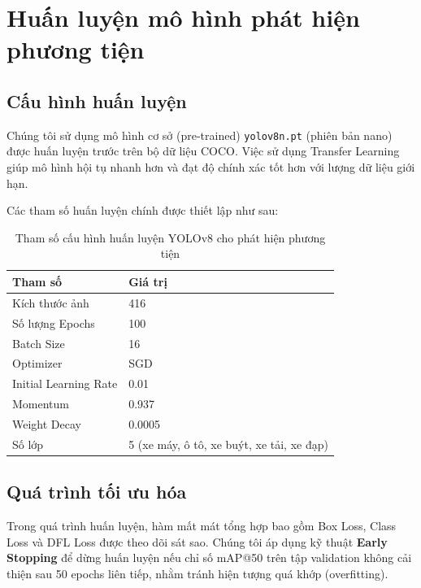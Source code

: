 \section{Huấn luyện mô hình phát hiện phương tiện}

\subsection{Cấu hình huấn luyện}
Chúng tôi sử dụng mô hình cơ sở (pre-trained) \texttt{yolov8n.pt} (phiên bản nano) được huấn luyện trước trên bộ dữ liệu COCO. Việc sử dụng Transfer Learning giúp mô hình hội tụ nhanh hơn và đạt độ chính xác tốt hơn với lượng dữ liệu giới hạn.

Các tham số huấn luyện chính được thiết lập như sau:

\begin{table}[!ht]
\centering
\caption{Tham số cấu hình huấn luyện YOLOv8 cho phát hiện phương tiện}
\label{tab:training_params_vehicle}
\begin{tabular}{|l|l|}
\hline
\textbf{Tham số} & \textbf{Giá trị} \\ \hline
Kích thước ảnh & 416 \\ \hline
Số lượng Epochs & 100 \\ \hline
Batch Size & 16 \\ \hline
Optimizer & SGD \\ \hline
Initial Learning Rate & 0.01 \\ \hline
Momentum & 0.937 \\ \hline
Weight Decay & 0.0005 \\ \hline
Số lớp & 5 (xe máy, ô tô, xe buýt, xe tải, xe đạp) \\ \hline
\end{tabular}
\end{table}

\subsection{Quá trình tối ưu hóa}
Trong quá trình huấn luyện, hàm mất mát tổng hợp bao gồm Box Loss, Class Loss và DFL Loss được theo dõi sát sao. Chúng tôi áp dụng kỹ thuật \textbf{Early Stopping} để dừng huấn luyện nếu chỉ số mAP@50 trên tập validation không cải thiện sau 50 epochs liên tiếp, nhằm tránh hiện tượng quá khớp (overfitting).

